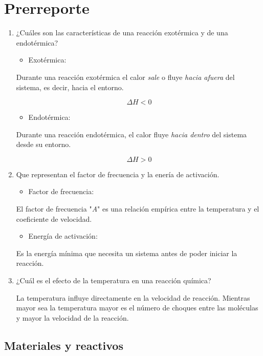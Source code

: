 \section{Prerreporte}
    \begin{enumerate}
        \item ¿Cuáles son las características de una reacción exotérmica y de una endotérmica?
            \begin{itemize}
                \item Exotérmica:
            \end{itemize}
        Durante una reacción exotérmica el calor \textit{sale} o fluye \textit{hacia afuera} del sistema, es decir, hacia el entorno.

                $$\Delta H<0$$
            \begin{itemize}
                \item Endotérmica:
            \end{itemize}
        Durante una reacción endotérmica, el calor fluye \textit{hacia dentro} 
        del sistema desde su entorno.

                $$\Delta H>0$$
        \item Que representan el factor de frecuencia y la enería de activación.
            \begin{itemize}
                \item Factor de frecuencia:
            \end{itemize}
        El factor de frecuencia "\textit{A}" es una relación empírica entre la
         temperatura y el coeficiente de velocidad.

            \begin{itemize}
                \item Energía de activación:
            \end{itemize}
         Es la energía mínima que necesita un sistema antes de poder iniciar la
          reacción.

        \item  ¿Cuál es el efecto de la temperatura en una reacción química?

        La temperatura influye directamente en la velocidad de reacción. Mientras mayor
         sea la temperatura mayor es el número de choques entre las moléculas y mayor 
         la velocidad de la reacción.
    \end{enumerate} 
    
    \subsection{Materiales y reactivos}
    
